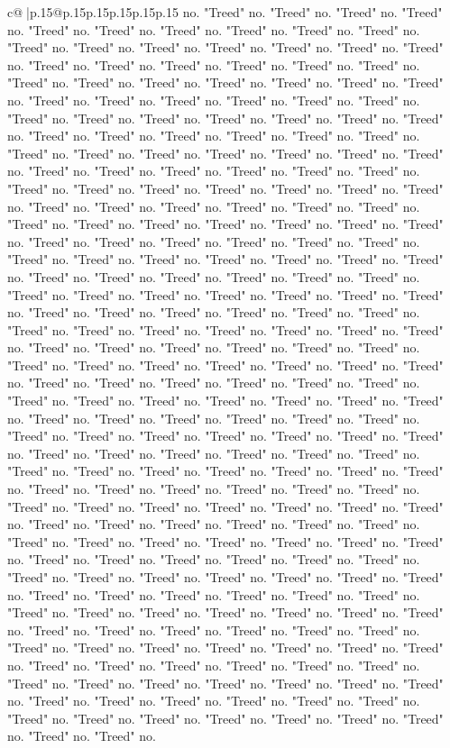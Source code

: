 \documentclass{article}
\begin{document}
{\begin{supertabular}{c@{$\;$}|p{.15\linewidth}@{}p{.15\linewidth}p{.15\linewidth}p{.15\linewidth}p{.15\linewidth}p{.15\linewidth}}
{{{no. "Treed" no. "Treed" no. "Treed" no. "Treed" no. "Treed" no. "Treed" no. "Treed" no. "Treed" no. "Treed" no. "Treed" no. "Treed" no. "Treed" no. "Treed" no. "Treed" no. "Treed" no. "Treed" no. "Treed" no. "Treed" no. "Treed" no. "Treed" no. "Treed" no. "Treed" no. "Treed" no. "Treed" no. "Treed" no. "Treed" no. "Treed" no. "Treed" no. "Treed" no. "Treed" no. "Treed" no. "Treed" no. "Treed" no. "Treed" no. "Treed" no. "Treed" no. "Treed" no. "Treed" no. "Treed" no. "Treed" no. "Treed" no. "Treed" no. "Treed" no. "Treed" no. "Treed" no. "Treed" no. "Treed" no. "Treed" no. "Treed" no. "Treed" no. "Treed" no. "Treed" no. "Treed" no. "Treed" no. "Treed" no. "Treed" no. "Treed" no. "Treed" no. "Treed" no. "Treed" no. "Treed" no. "Treed" no. "Treed" no. "Treed" no. "Treed" no. "Treed" no. "Treed" no. "Treed" no. "Treed" no. "Treed" no. "Treed" no. "Treed" no. "Treed" no. "Treed" no. "Treed" no. "Treed" no. "Treed" no. "Treed" no. "Treed" no. "Treed" no. "Treed" no. "Treed" no. "Treed" no. "Treed" no. "Treed" no. "Treed" no. "Treed" no. "Treed" no. "Treed" no. "Treed" no. "Treed" no. "Treed" no. "Treed" no. "Treed" no. "Treed" no. "Treed" no. "Treed" no. "Treed" no. "Treed" no. "Treed" no. "Treed" no. "Treed" no. "Treed" no. "Treed" no. "Treed" no. "Treed" no. "Treed" no. "Treed" no. "Treed" no. "Treed" no. "Treed" no. "Treed" no. "Treed" no. "Treed" no. "Treed" no. "Treed" no. "Treed" no. "Treed" no. "Treed" no. "Treed" no. "Treed" no. "Treed" no. "Treed" no. "Treed" no. "Treed" no. "Treed" no. "Treed" no. "Treed" no. "Treed" no. "Treed" no. "Treed" no. "Treed" no. "Treed" no. "Treed" no. "Treed" no. "Treed" no. "Treed" no. "Treed" no. "Treed" no. "Treed" no. "Treed" no. "Treed" no. "Treed" no. "Treed" no. "Treed" no. "Treed" no. "Treed" no. "Treed" no. "Treed" no. "Treed" no. "Treed" no. "Treed" no. "Treed" no. "Treed" no. "Treed" no. "Treed" no. "Treed" no. "Treed" no. "Treed" no. "Treed" no. "Treed" no. "Treed" no. "Treed" no. "Treed" no. "Treed" no. "Treed" no. "Treed" no. "Treed" no. "Treed" no. "Treed" no. "Treed" no. "Treed" no. "Treed" no. "Treed" no. "Treed" no. "Treed" no. "Treed" no. "Treed" no. "Treed" no. "Treed" no. "Treed" no. "Treed" no. "Treed" no. "Treed" no. "Treed" no. "Treed" no. "Treed" no. "Treed" no. "Treed" no. "Treed" no. "Treed" no. "Treed" no. "Treed" no. "Treed" no. "Treed" no. "Treed" no. "Treed" no. "Treed" no. "Treed" no. "Treed" no. "Treed" no. "Treed" no. "Treed" no. "Treed" no. "Treed" no. "Treed" no. "Treed" no. "Treed" no. "Treed" no. "Treed" no. "Treed" no. "Treed" no. "Treed" no. "Treed" no. "Treed" no. "Treed" no. "Treed" no. "Treed" no. "Treed" no. "Treed" no. "Treed" no. "Treed" no. "Treed" no. "Treed" no. "Treed" no. "Treed" no. "Treed" no. "Treed" no. "Treed" no. "Treed" no. "Treed" no. "Treed" no. "Treed" no. "Treed" no. "Treed" no. "Treed" no. "Treed" no. "Treed" no. "Treed" no. "Treed" no. "Treed" no. "Treed" no. "Treed" no. "Treed" no. "Treed" no. "Treed" no. "Treed" no. "Treed" no. "Treed" no. "Treed" no. "Treed" no. "Treed" no. "Treed" no. "Treed" no. "Treed" no. "Treed" no. "Treed" no. "Treed" no. "Treed" no. "Treed" no. "Treed" no. "Treed" no. "Treed" no. "Treed" no. "Treed" no. "Treed" no. }}}
\end{supertabular}}
\end{document}
